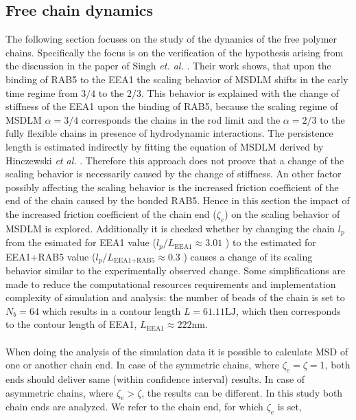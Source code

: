 \documentclass[
    paper=A4,pagesize=automedia,fontsize=12pt,
    BCOR=15mm,DIV=22,
    twoside,headinclude,footinclude=false,
    fleqn,             %
    bibliography=totocnumbered,          %
    listof=totoc,                %
    listof=flat,                 %
    cleardoublepage=empty      %
    numbers=endperiod
]{scrartcl}
\begin{document}
\subsection{Free chain dynamics} \label{sec:free_chain_dynamicss}
The following section focuses on the study of the dynamics of the 
free polymer chains. Specifically the focus is on the verification
of the hypothesis arising from the discussion in the paper of 
Singh \emph{et. al.} \cite{Singh:2022}. Their work shows, that upon the 
binding of RAB5 to the EEA1 the scaling behavior of MSDLM shifts in 
the early time regime from $3/4$ to the $2/3$. This behavior is explained
with the change of stiffness of the EEA1 upon the binding of RAB5, because
the scaling regime of MSDLM $\alpha=3/4$ corresponds the chains in the rod limit
and the $\alpha=2/3$ to the fully flexible chains in presence of hydrodynamic 
interactions. The persistence length is estimated indirectly by 
fitting the equation of MSDLM \cite{Singh:2022} derived by 
Hinczewski \emph{et al.} \cite{Hinczewski_2009}. Therefore this approach does
not proove that a change of the scaling behavior is necessarily caused by the change
of stiffness. An other factor possibly affecting the scaling behavior
is the increased friction coefficient of the end of the chain caused by the
bonded RAB5. Hence in this section the impact of the increased friction 
coefficient of the chain end ($\zeta_e$) on the scaling behavior of MSDLM is explored.
Additionally it is checked whether by changing the chain $l_p$ from the 
esimated for EEA1 value ($l_p/L_{\text{EEA1}} \approx 3.01$ \cite{Singh:2022}) to
the estimated for EEA1+RAB5 value 
($l_p/L_{\text{EEA1+RAB5}} \approx 0.3$ \cite{Singh:2022}) causes a change of its 
scaling behavior similar to the experimentally observed change.
Some simplifications are made to reduce the computational resources
requirements and implementation complexity of simulation and analysis:
the number of beads of the chain is set to $N_b=64$ which results in a
contour length $L=61.11\text{LJ}$, which then corresponds to the contour length of EEA1,
$L_{\text{EEA1}}\approx222\text{nm}$.
\\
\\
When doing the analysis of the simulation data it is possible to 
calculate MSD of one or another
chain end. In case of the symmetric chains, where $\zeta_e=\zeta=1$, both ends should 
deliver same (within confidence interval) results. In case of asymmetric chains,
where $\zeta_e > \zeta$, the results can be different. In this study
both chain ends are analyzed. We refer to the chain end, for which $\zeta_e$ is set,
\end{document}
